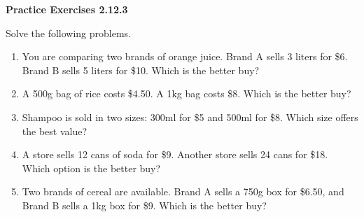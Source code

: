  \vspace{1ex}
\noindent\textbf{Practice Exercises 2.12.3}

\vspace{0.75ex}

Solve the following problems. 
\begin{enumerate}[noitemsep, label = \color{blue}\arabic*. ]
    \item You are comparing two brands of orange juice. Brand A sells 3 liters for \$6. Brand B sells 5 liters for \$10. Which is the better buy?
    \item A 500g bag of rice costs \$4.50. A 1kg bag costs \$8. Which is the better buy?
    \item Shampoo is sold in two sizes: 300ml for \$5 and 500ml for \$8. Which size offers the best value?
    \item A store sells 12 cans of soda for \$9. Another store sells 24 cans for \$18. Which option is the better buy?
    \item Two brands of cereal are available. Brand A sells a 750g box for \$6.50, and Brand B sells a 1kg box for \$9. Which is the better buy?
\end{enumerate}

